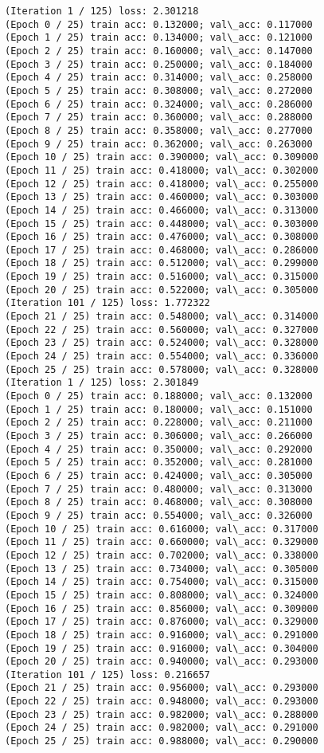 \documentclass[11pt]{article}
\begin{document}
    \begin{Verbatim}[commandchars=\\\{\}]
(Iteration 1 / 125) loss: 2.301218
(Epoch 0 / 25) train acc: 0.132000; val\_acc: 0.117000
(Epoch 1 / 25) train acc: 0.134000; val\_acc: 0.121000
(Epoch 2 / 25) train acc: 0.160000; val\_acc: 0.147000
(Epoch 3 / 25) train acc: 0.250000; val\_acc: 0.184000
(Epoch 4 / 25) train acc: 0.314000; val\_acc: 0.258000
(Epoch 5 / 25) train acc: 0.308000; val\_acc: 0.272000
(Epoch 6 / 25) train acc: 0.324000; val\_acc: 0.286000
(Epoch 7 / 25) train acc: 0.360000; val\_acc: 0.288000
(Epoch 8 / 25) train acc: 0.358000; val\_acc: 0.277000
(Epoch 9 / 25) train acc: 0.362000; val\_acc: 0.263000
(Epoch 10 / 25) train acc: 0.390000; val\_acc: 0.309000
(Epoch 11 / 25) train acc: 0.418000; val\_acc: 0.302000
(Epoch 12 / 25) train acc: 0.418000; val\_acc: 0.255000
(Epoch 13 / 25) train acc: 0.460000; val\_acc: 0.303000
(Epoch 14 / 25) train acc: 0.466000; val\_acc: 0.313000
(Epoch 15 / 25) train acc: 0.448000; val\_acc: 0.303000
(Epoch 16 / 25) train acc: 0.476000; val\_acc: 0.308000
(Epoch 17 / 25) train acc: 0.468000; val\_acc: 0.286000
(Epoch 18 / 25) train acc: 0.512000; val\_acc: 0.299000
(Epoch 19 / 25) train acc: 0.516000; val\_acc: 0.315000
(Epoch 20 / 25) train acc: 0.522000; val\_acc: 0.305000
(Iteration 101 / 125) loss: 1.772322
(Epoch 21 / 25) train acc: 0.548000; val\_acc: 0.314000
(Epoch 22 / 25) train acc: 0.560000; val\_acc: 0.327000
(Epoch 23 / 25) train acc: 0.524000; val\_acc: 0.328000
(Epoch 24 / 25) train acc: 0.554000; val\_acc: 0.336000
(Epoch 25 / 25) train acc: 0.578000; val\_acc: 0.328000
(Iteration 1 / 125) loss: 2.301849
(Epoch 0 / 25) train acc: 0.188000; val\_acc: 0.132000
(Epoch 1 / 25) train acc: 0.180000; val\_acc: 0.151000
(Epoch 2 / 25) train acc: 0.228000; val\_acc: 0.211000
(Epoch 3 / 25) train acc: 0.306000; val\_acc: 0.266000
(Epoch 4 / 25) train acc: 0.350000; val\_acc: 0.292000
(Epoch 5 / 25) train acc: 0.352000; val\_acc: 0.281000
(Epoch 6 / 25) train acc: 0.424000; val\_acc: 0.305000
(Epoch 7 / 25) train acc: 0.480000; val\_acc: 0.313000
(Epoch 8 / 25) train acc: 0.468000; val\_acc: 0.308000
(Epoch 9 / 25) train acc: 0.554000; val\_acc: 0.326000
(Epoch 10 / 25) train acc: 0.616000; val\_acc: 0.317000
(Epoch 11 / 25) train acc: 0.660000; val\_acc: 0.329000
(Epoch 12 / 25) train acc: 0.702000; val\_acc: 0.338000
(Epoch 13 / 25) train acc: 0.734000; val\_acc: 0.305000
(Epoch 14 / 25) train acc: 0.754000; val\_acc: 0.315000
(Epoch 15 / 25) train acc: 0.808000; val\_acc: 0.324000
(Epoch 16 / 25) train acc: 0.856000; val\_acc: 0.309000
(Epoch 17 / 25) train acc: 0.876000; val\_acc: 0.329000
(Epoch 18 / 25) train acc: 0.916000; val\_acc: 0.291000
(Epoch 19 / 25) train acc: 0.916000; val\_acc: 0.304000
(Epoch 20 / 25) train acc: 0.940000; val\_acc: 0.293000
(Iteration 101 / 125) loss: 0.216657
(Epoch 21 / 25) train acc: 0.956000; val\_acc: 0.293000
(Epoch 22 / 25) train acc: 0.948000; val\_acc: 0.293000
(Epoch 23 / 25) train acc: 0.982000; val\_acc: 0.288000
(Epoch 24 / 25) train acc: 0.982000; val\_acc: 0.291000
(Epoch 25 / 25) train acc: 0.988000; val\_acc: 0.290000

    \end{Verbatim}
\end{document}
